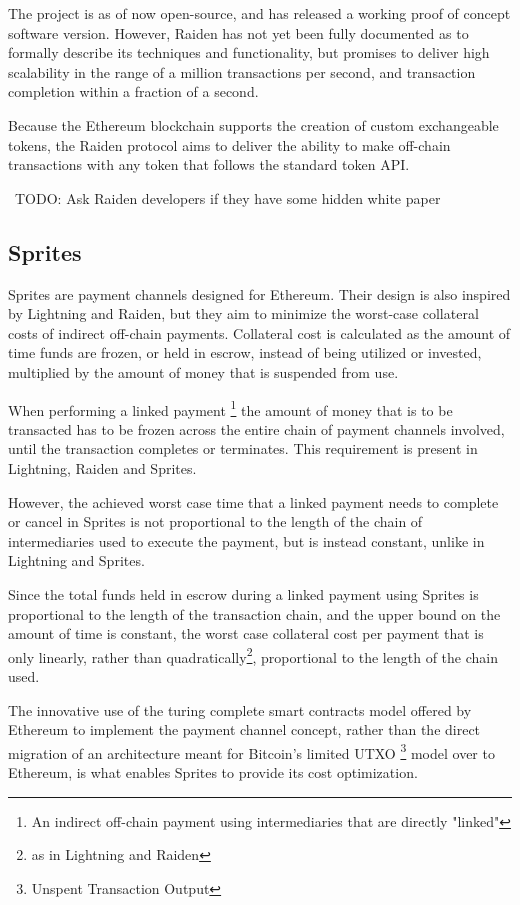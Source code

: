 \documentclass[12pt]{article}
\newcommand{\todo}[1]{{\color{red}\ TODO: {#1}}}
\begin{document}
The project is as of now open-source, and has released a working proof of concept software version. However, Raiden has not yet been fully documented as to formally describe its techniques and functionality, but promises to deliver high scalability in the range of a million transactions per second, and transaction completion within a fraction of a second.

Because the Ethereum blockchain supports the creation of custom exchangeable tokens, the Raiden protocol aims to deliver the ability to make off-chain transactions with any token that follows the standard token API\cite{ethereum}.

\todo{Ask Raiden developers if they have some hidden white paper}


\subsection{Sprites}
Sprites\cite{sprites} are payment channels designed for Ethereum. Their design is also inspired by Lightning and Raiden, but they aim to minimize the worst-case collateral costs of indirect off-chain payments. Collateral cost is calculated as the amount of time funds are frozen, or held in escrow, instead of being utilized or invested, multiplied by the amount of money that is suspended from use.

When performing a linked payment
\footnote{An indirect off-chain payment using intermediaries that are directly "linked"}
the amount of money that is to be transacted has to be frozen across the entire chain of payment channels involved, until the transaction completes or terminates. This requirement is present in Lightning, Raiden and Sprites.

However, the achieved worst case time that a linked payment needs to complete or cancel in Sprites is not proportional to the length of the chain of intermediaries used to execute the payment, but is instead constant, unlike in Lightning and Sprites.

Since the total funds held in escrow during a linked payment using Sprites is proportional to the length of the transaction chain, and the upper bound on the amount of time is constant, the worst case collateral cost per payment that is only linearly, rather than quadratically\footnote{as in Lightning and Raiden}, proportional to the length of the chain used.

The innovative use of the turing complete smart contracts model offered by Ethereum to implement the payment channel concept, rather than the direct migration of an architecture meant for Bitcoin's limited UTXO
\footnote{Unspent Transaction Output}
model over to Ethereum, is what enables Sprites to provide its cost optimization.
\end{document}
